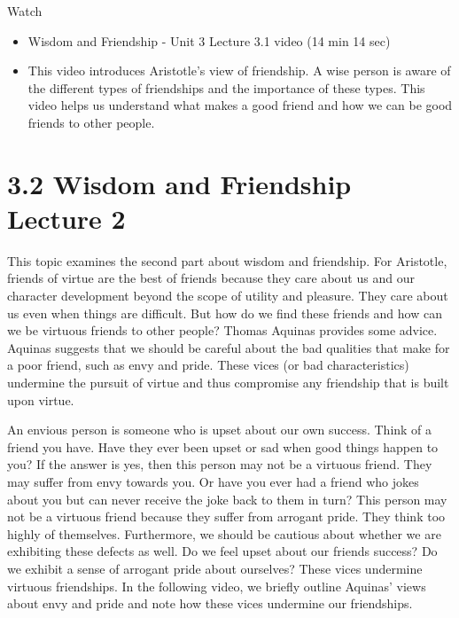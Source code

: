 \documentclass[
]{book}
\providecommand{\tightlist}{%
  \setlength{\itemsep}{0pt}\setlength{\parskip}{0pt}}
\begin{document}
Watch

\begin{itemize}
\tightlist
\item
  Wisdom and Friendship - Unit 3 Lecture 3.1 video (14 min 14 sec)
\item
  This video introduces Aristotle's view of friendship. A wise person is aware of the different types of friendships and the importance of these types. This video helps us understand what makes a good friend and how we can be good friends to other people.
\end{itemize}

\hypertarget{wisdom-and-friendship-lecture-2}{%
\section*{3.2 Wisdom and Friendship Lecture 2}\label{wisdom-and-friendship-lecture-2}}

This topic examines the second part about wisdom and friendship. For Aristotle, friends of virtue are the best of friends because they care about us and our character development beyond the scope of utility and pleasure. They care about us even when things are difficult. But how do we find these friends and how can we be virtuous friends to other people? Thomas Aquinas provides some advice. Aquinas suggests that we should be careful about the bad qualities that make for a poor friend, such as envy and pride. These vices (or bad characteristics) undermine the pursuit of virtue and thus compromise any friendship that is built upon virtue.

An envious person is someone who is upset about our own success. Think of a friend you have. Have they ever been upset or sad when good things happen to you? If the answer is yes, then this person may not be a virtuous friend. They may suffer from envy towards you. Or have you ever had a friend who jokes about you but can never receive the joke back to them in turn? This person may not be a virtuous friend because they suffer from arrogant pride. They think too highly of themselves. Furthermore, we should be cautious about whether we are exhibiting these defects as well. Do we feel upset about our friends success? Do we exhibit a sense of arrogant pride about ourselves? These vices undermine virtuous friendships. In the following video, we briefly outline Aquinas' views about envy and pride and note how these vices undermine our friendships.
\end{document}
